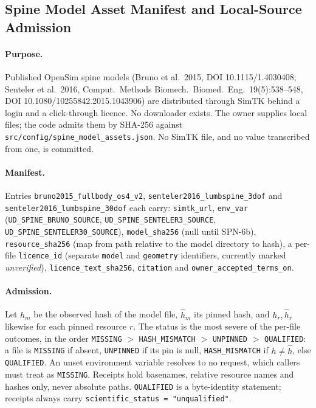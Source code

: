 \subsection{Spine Model Asset Manifest and Local-Source Admission}
\label{sec:spn-6a}

\paragraph{Purpose.}
Published OpenSim spine models (Bruno et al.\ 2015, DOI 10.1115/1.4030408;
Senteler et al.\ 2016, Comput.\ Methods Biomech.\ Biomed.\ Eng.\ 19(5):538--548,
DOI 10.1080/10255842.2015.1043906) are distributed through SimTK behind a login
and a click-through licence. No downloader exists. The owner supplies local
files; the code admits them by SHA-256 against
\texttt{src/config/spine\_model\_assets.json}. No SimTK file, and no value
transcribed from one, is committed.

\paragraph{Manifest.}
Entries \texttt{bruno2015\_fullbody\_os4\_v2}, \texttt{senteler2016\_lumbspine\_3dof}
and \texttt{senteler2016\_lumbspine\_30dof} each carry: \texttt{simtk\_url},
\texttt{env\_var} (\texttt{UD\_SPINE\_BRUNO\_SOURCE}, \texttt{UD\_SPINE\_SENTELER3\_SOURCE},
\texttt{UD\_SPINE\_SENTELER30\_SOURCE}), \texttt{model\_sha256} (null until SPN-6b),
\texttt{resource\_sha256} (map from path relative to the model directory to hash),
a per-file \texttt{licence\_id} (separate \texttt{model} and \texttt{geometry}
identifiers, currently marked \emph{unverified}), \texttt{licence\_text\_sha256},
\texttt{citation} and \texttt{owner\_accepted\_terms\_on}.

\paragraph{Admission.}
Let $h_m$ be the observed hash of the model file, $\hat h_m$ its pinned hash, and
$h_r,\hat h_r$ likewise for each pinned resource $r$. The status is the most
severe of the per-file outcomes, in the order
\texttt{MISSING} $>$ \texttt{HASH\_MISMATCH} $>$ \texttt{UNPINNED} $>$
\texttt{QUALIFIED}: a file is \texttt{MISSING} if absent, \texttt{UNPINNED} if
its pin is null, \texttt{HASH\_MISMATCH} if $h\neq\hat h$, else
\texttt{QUALIFIED}. An unset environment variable resolves to no request, which
callers must treat as \texttt{MISSING}. Receipts hold basenames, relative
resource names and hashes only, never absolute paths. \texttt{QUALIFIED} is a
byte-identity statement; receipts always carry
\texttt{scientific\_status = "unqualified"}.

